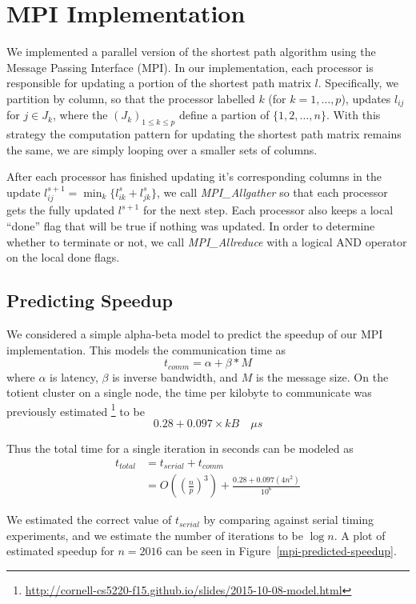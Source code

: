 \documentclass[11pt]{article}
\begin{document}
\section*{MPI Implementation}

We implemented a parallel version of the shortest path algorithm using the
Message Passing Interface (MPI).
In our implementation, each processor is responsible for updating a portion of 
the shortest path matrix $l$.  Specifically, we partition by column, so that 
the processor labelled $k$ (for $k = 1, \ldots, p$), updates $l_{ij}$ for 
$j \in J_k$, where the $(J_k)_{1 \leq k \leq p}$ define a partion of 
$\{1, 2, \ldots, n\}$.
With this strategy the computation pattern for updating the shortest path matrix
remains the same, we are simply looping over a smaller sets of columns.

After each processor has finished updating it's corresponding columns in
the update $l_{ij}^{s+1} = \min_k \{ l^s_{ik} + l^s_{jk} \}$, we call
\emph{MPI\_Allgather} so that each processor gets the fully updated $l^{s+1}$
for the next step.  Each processor also keeps a local ``done'' flag that will
	be true if nothing was updated.  In order to determine whether to terminate
	or not, we call \emph{MPI\_Allreduce} with a logical AND operator on the local
	done flags.


\subsection*{Predicting Speedup}

We considered a simple alpha-beta model to predict the speedup of our MPI implementation.
This models the communication time as
\[ t_{comm} = \alpha + \beta * M \] 
where $\alpha$ is latency, $\beta$ is inverse bandwidth, and $M$ is the message size.
On the totient cluster on a single node, the time per kilobyte to communicate
was previously estimated
\footnote{\url{http://cornell-cs5220-f15.github.io/slides/2015-10-08-model.html}} to be
\[ 0.28 + 0.097 \times kB \quad \mu s \]

Thus the total time for a single iteration
in seconds can be modeled as
\begin{align*}
t_{total} &= t_{serial} + t_{comm} \\
&= O\left(\left(\frac{n}{p}\right)^3\right) + \frac{0.28 + 0.097(4n^2)}{10^6}
\end{align*}

We estimated the correct value of $t_{serial}$ by comparing against serial timing 
experiments, and we estimate the number of iterations to be $\log n$.
A plot of estimated speedup for $n=2016$ can be seen in Figure~\ref{mpi-predicted-speedup}.
\end{document}
